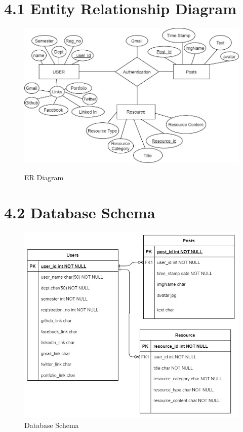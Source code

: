 \documentclass{standalone}
\begin{document}
\section*{4.1\hspace{0.3 cm} Entity Relationship Diagram}
 \vspace{0.3cm}

\newpage
\vfill

\begin{figure}
\includegraphics[scale=0.5]{./img/ER1.jpg}\\[2cm]
\caption{ER Diagram} 
 \label{fig:ER1}
\end{figure}

\section*{4.2\hspace{0.3 cm} Database Schema}
 \vspace{0.3cm}

\begin{figure}
\includegraphics[scale=0.5]{./img/ER2.jpg} 
\caption{Database Schema}
 \label{fig:ER2}
\end{figure}


\clearpage
\vfill
\end{document}

